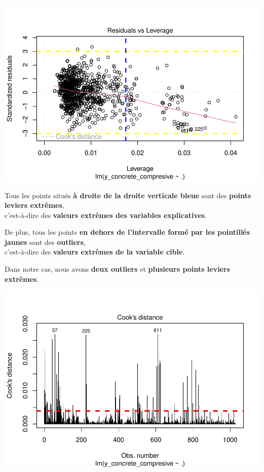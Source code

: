 \documentclass[
  12pt,
]{article}
\begin{document}
\includegraphics{rmd_final_files/figure-latex/unnamed-chunk-21-1.pdf}

Tous les points situés \textbf{à droite de la droite verticale bleue}
sont des \textbf{points leviers extrêmes},\\
c'est-à-dire des \textbf{valeurs extrêmes des variables explicatives}.

De plus, tous les points \textbf{en dehors de l'intervalle formé par les
pointillés jaunes} sont des \textbf{outliers},\\
c'est-à-dire des \textbf{valeurs extrêmes de la variable cible}.

Dans notre cas, nous avons \textbf{deux outliers} et \textbf{plusieurs
points leviers extrêmes}.

\includegraphics{rmd_final_files/figure-latex/unnamed-chunk-22-1.pdf}
\end{document}

